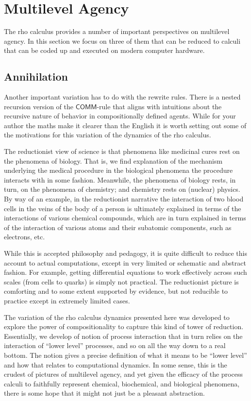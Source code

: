 \section{Multilevel Agency}
The rho calculus provides a number of important perspectives on
multilevel agency. In this section we focus on three of them that can
be reduced to calculi that can be coded up and executed on modern
computer hardware.

\subsection{Annihilation}
Another important variation has to do with the rewrite rules. There is
a nested recursion version of the $\mathsf{COMM}$-rule that aligns
with intuitions about the recursive nature of behavior in
compositionally defined agents. While for your author the maths make
it clearer than the English it is worth setting out some of the
motivations for this variation of the dynamics of the rho
calculus.

The reductionist view of science is that phenomena like medicinal
cures rest on the phenomena of biology. That is, we find explanation
of the mechanism underlying the medical procedure in the biological
phenomena the procedure interacts with in some fashion. Meanwhile, the
phenomena of biology rests, in turn, on the phenomena of chemistry;
and chemistry rests on (nuclear) physics. By way of an example, in the
reductionist narrative the interaction of two blood cells in the veins
of the body of a person is ultimately explained in terms of the
interactions of various chemical compounds, which are in turn
explained in terms of the interaction of various atoms and their
subatomic components, such as electrons, etc.

While this is accepted philosophy and pedagogy, it is quite difficult
to reduce this account to actual computations, except in very limited
or schematic and abstract fashion. For example, getting differential
equations to work effectively across such scales (from cells to
quarks) is simply not practical. The reductionist picture is
comforting and to some extent supported by evidence, but not reducible
to practice except in extremely limited cases.

The variation of the rho calculus dynamics presented here was
developed to explore the power of compositionality to capture this
kind of tower of reduction. Essentially, we develop of notion of
process interaction that in turn relies on the interaction of ``lower
level'' processes, and so on all the way down to a real bottom. The
notion gives a precise definition of what it means to be ``lower
level'' and how that relates to computational dynamics. In some sense,
this is the crudest of pictures of multilevel agency, and yet given
the efficacy of the process calculi to faithfully represent chemical,
biochemical, and biological phenomena, there is some hope that it
might not just be a pleasant abstraction.

